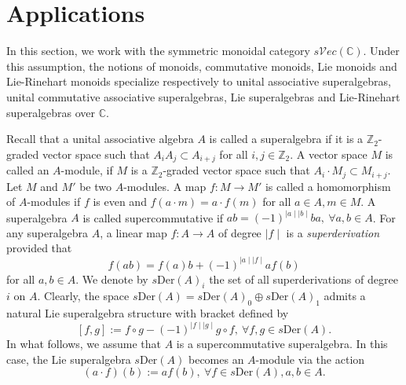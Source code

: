 \documentclass[11pt]{amsart}
\newcommand{\bbC}{\mathbb{C}}
\newcommand{\bbZ}{\mathbb{Z}}
\newcommand{\calC}{\mathcal{C}}
\theoremstyle{definition}
\numberwithin{equation}{section}
\begin{document}
\section{Applications}\label{app}
In this section, we work with the symmetric monoidal category $s\mathcal{V}ec(\bbC)$. Under this assumption, the notions of monoids, commutative monoids, Lie monoids and Lie-Rinehart monoids specialize respectively to  unital associative superalgebras,  unital commutative associative superalgebras,  Lie superalgebras and Lie-Rinehart superalgebras over $\bbC$.

Recall that a unital associative algebra $A$ is called a superalgebra if it is a $\bbZ_2$-graded vector space such that $A_i A_j \subset A_{i+j}$ for all $i,j \in \bbZ_2$. A vector space $M$ is called an $A$-module, if $M$ is a $\bbZ_2$-graded vector space such that $A_i \cdot M_j \subset M_{i+j}$. Let $M$ and $M'$ be two $A$-modules. A map $f:M\to M'$ is called a homomorphism of $A$-modules if $f$ is even and $f(a \cdot m)=a\cdot f(m)$ for all $a\in A,m\in M.$
A superalgebra $A$ is called supercommutative if $ab=(-1)^{\mid a \mid \mid b\mid}ba, \ \forall a,b \in A$. For any superalgebra $A$, a linear map $f:A \to A$ of degree $\mid f\mid$ is a \emph{superderivation} provided that
\[f(ab)=f(a)b +(-1)^{\mid a \mid \mid f \mid } af(b)  \]
for all $a,b\in A.$ We denote by $s\mathrm{Der}(A)_i$ the set of all superderivations of degree $i$ on $A$. 
Clearly, the space $s\mathrm{Der}(A)=s\mathrm{Der}(A)_0 \oplus s\mathrm{Der}(A)_1$ admits a natural Lie superalgebra  structure with bracket defined by 
\[[f,g]:=f \circ g -(-1)^{\mid f \mid \mid g \mid }g \circ f, \ \forall f,g\in s\mathrm{Der}(A).\]
In what follows, we assume that $A$ is a supercommutative superalgebra. 
In this case, the Lie superalgebra $s\mathrm{Der}(A)$ becomes an $A$-module via the action 
\[(a\cdot f)(b):=af(b), \  \forall f\in s\mathrm{Der}(A), a,b\in A.\]
		
\end{document}

